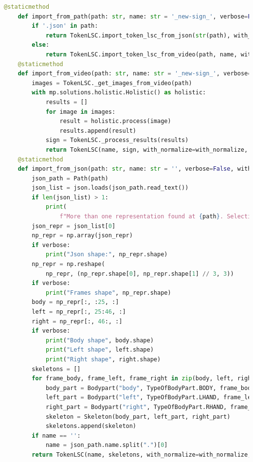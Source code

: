 \begin{lstlisting}[basicstyle=\tiny,language=Python, caption={Métodos estático para importar tokens de la clase TokenLSC}, label={code:tokenlsc:imports}] 
    @staticmethod
    def import_from_path(path: str, name: str = '_new-sign_', verbose=False, with_normalize=True, with_crop=True) -> 'TokenLSC':
        if '.json' in path:
            return TokenLSC.import_token_lsc_from_json(str(path), with_normalize=True, with_crop=True)
        else:
            return TokenLSC.import_token_lsc_from_video(path, name, with_normalize=True, with_crop=True)
    @staticmethod
    def import_from_video(path: str, name: str = '_new-sign_', verbose=False, with_normalize=True, with_crop=True) -> 'TokenLSC':
        images = TokenLSC._get_images_from_video(path)
        with mp.solutions.holistic.Holistic() as holistic:
            results = []
            for image in images:
                result = holistic.process(image)
                results.append(result)
            sign = TokenLSC._process_results(results)
            return TokenLSC(name, sign, with_normalize=with_normalize, with_crop=with_crop)
    @staticmethod
    def import_from_json(path: str, name: str = '', verbose=False, with_normalize=True, with_crop=True) -> 'TokenLSC':
        json_path = Path(path)
        json_list = json.loads(json_path.read_text())
        if len(json_list) > 1:
            print(
                f"More than one representation found at {path}. Selecting first representation.")
        json_repr = json_list[0]
        np_repr = np.array(json_repr)
        if verbose:
            print("Json shape:", np_repr.shape)
        np_repr = np.reshape(
            np_repr, (np_repr.shape[0], np_repr.shape[1] // 3, 3))
        if verbose:
            print("Frames shape", np_repr.shape)
        body = np_repr[:, :25, :]
        left = np_repr[:, 25:46, :]
        right = np_repr[:, 46:, :]
        if verbose:
            print("Body shape", body.shape)
            print("Left shape", left.shape)
            print("Right shape", right.shape)
        skeletons = []
        for frame_body, frame_left, frame_right in zip(body, left, right):
            body_part = Bodypart("body", TypeOfBodyPart.BODY, frame_body)
            left_part = Bodypart("left", TypeOfBodyPart.LHAND, frame_left)
            right_part = Bodypart("right", TypeOfBodyPart.RHAND, frame_right)
            skeleton = Skeleton(body_part, left_part, right_part)
            skeletons.append(skeleton)
        if name == '':
            name = json_path.name.split(".")[0]
        return TokenLSC(name, skeletons, with_normalize=with_normalize, with_crop=with_crop)
\end{lstlisting}


